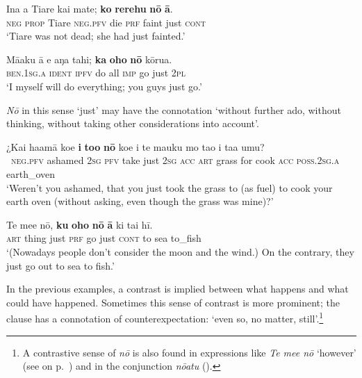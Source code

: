\ea\label{ex:7.102}
\gll {\ꞌ}Ina a Tiare kai mate; \textbf{ko} \textbf{rerehu} \textbf{nō} \textbf{{\ꞌ}ā}. \\
\textsc{neg} \textsc{prop} Tiare \textsc{neg.pfv} die \textsc{prf} faint just \textsc{cont} \\

\glt 
‘Tiare was not dead; she had just fainted.’ \textstyleExampleref{[R481.086]} 
\z

\ea\label{ex:7.103}
\gll Mā{\ꞌ}aku {\ꞌ}ā e aŋa tahi; \textbf{ka} \textbf{oho} \textbf{nō} kōrua. \\
\textsc{ben.1sg.a} \textsc{ident} \textsc{ipfv} do all \textsc{imp} go just \textsc{2pl} \\

\glt
‘I myself will do everything; you guys just go.’ \textstyleExampleref{[R236.010]} 
\z

\textit{Nō} in this sense ‘just’ may have the connotation ‘without further ado, without thinking, without taking other considerations into account’.

\ea\label{ex:7.104}
\gll ¿Kai ha{\ꞌ}amā koe \textbf{i} \textbf{to{\ꞌ}o} \textbf{nō} koe i te mauku mo ta{\ꞌ}o i ta{\ꞌ}a {\ꞌ}umu?\\
~\textsc{neg.pfv} ashamed \textsc{2sg} \textsc{pfv} take just \textsc{2sg} \textsc{acc} \textsc{art} grass for cook  \textsc{acc} \textsc{poss.2sg.a} earth\_oven\\

\glt 
‘Weren’t you ashamed, that you just took the grass to (as fuel) to cook your earth oven (without asking, even though the grass was mine)?’ \textstyleExampleref{[R231.186]} 
\z

\ea\label{ex:7.105}
\gll Te me{\ꞌ}e nō, \textbf{ku} \textbf{oho} \textbf{nō} \textbf{{\ꞌ}ā} ki tai hī. \\
\textsc{art} thing just \textsc{prf} go just \textsc{cont} to sea to\_fish \\

\glt 
‘(Nowadays people don’t consider the moon and the wind.) On the contrary, they just go out to sea to fish.’ \textstyleExampleref{[R354.026]} 
\z

In the previous examples, a contrast is implied between what happens and what could have happened. Sometimes this sense of contrast is more prominent; the clause has a connotation of counterexpectation: ‘even so, no matter, still’.\footnote{\label{fn:346}A contrastive sense of \textit{nō} is also found in expressions like \textit{Te me{\ꞌ}e nō} ‘however’ (see  on p.~\pageref{ex:5.153}) and in the conjunction \textit{nōatu} ().}

